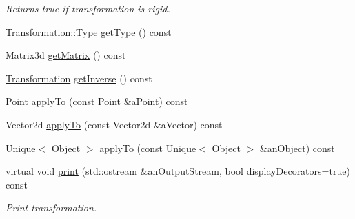 \begin{DoxyCompactItemize}
\begin{DoxyCompactList}\small\item\em Returns true if transformation is rigid. \end{DoxyCompactList}\item 
\hyperlink{classlibrary_1_1math_1_1geom_1_1d2_1_1_transformation_af2a94a7be48a51e9cc40f3075040d348}{Transformation\+::\+Type} \hyperlink{classlibrary_1_1math_1_1geom_1_1d2_1_1_transformation_a295309ae952d473473540a5647a168c4}{get\+Type} () const
\item 
Matrix3d \hyperlink{classlibrary_1_1math_1_1geom_1_1d2_1_1_transformation_aad810cf9245ff4eea64b206cbce86e1b}{get\+Matrix} () const
\item 
\hyperlink{classlibrary_1_1math_1_1geom_1_1d2_1_1_transformation}{Transformation} \hyperlink{classlibrary_1_1math_1_1geom_1_1d2_1_1_transformation_a17f1e24ee5a53d546dcaa4139b7c4ef0}{get\+Inverse} () const
\item 
\hyperlink{classlibrary_1_1math_1_1geom_1_1d2_1_1objects_1_1_point}{Point} \hyperlink{classlibrary_1_1math_1_1geom_1_1d2_1_1_transformation_a03f3bc115d7db05f3351ae9095a69b65}{apply\+To} (const \hyperlink{classlibrary_1_1math_1_1geom_1_1d2_1_1objects_1_1_point}{Point} \&a\+Point) const
\item 
Vector2d \hyperlink{classlibrary_1_1math_1_1geom_1_1d2_1_1_transformation_a0592b1f7d778cbd70917af69b347dc64}{apply\+To} (const Vector2d \&a\+Vector) const
\item 
Unique$<$ \hyperlink{classlibrary_1_1math_1_1geom_1_1d2_1_1_object}{Object} $>$ \hyperlink{classlibrary_1_1math_1_1geom_1_1d2_1_1_transformation_a630589d56afe574df3bc37c5cd9a6209}{apply\+To} (const Unique$<$ \hyperlink{classlibrary_1_1math_1_1geom_1_1d2_1_1_object}{Object} $>$ \&an\+Object) const
\item 
virtual void \hyperlink{classlibrary_1_1math_1_1geom_1_1d2_1_1_transformation_a39eab30cef450921059006ee72a8f8e8}{print} (std\+::ostream \&an\+Output\+Stream, bool display\+Decorators=true) const
\begin{DoxyCompactList}\small\item\em Print transformation. \end{DoxyCompactList}\end{DoxyCompactItemize}
